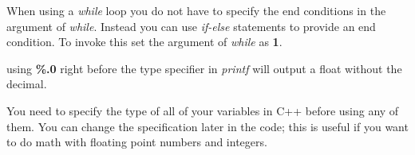 \documentclass{article}
\begin{document}
When using a \textit{while} loop you do not have to specify the end conditions in the argument of \textit{while}. Instead you can use \textit{if-else} statements to provide an end condition. To invoke this set the argument of \textit{while} as \textbf{1}.

using \textbf{\%.0} right before the type specifier in \textit{printf} will output a float without the decimal.

You need to specify the type of all of your variables in C++ before using any of them. You can change the specification later in the code; this is useful if you want to do math with floating point numbers and integers.
\end{document}
